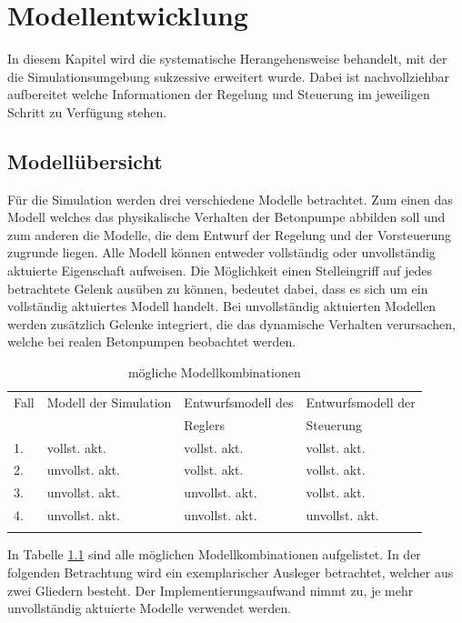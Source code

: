 \chapter{Modellentwicklung}\label{ch:modellentwicklung}

In diesem Kapitel wird die systematische Herangehensweise behandelt, mit der die Simulationsumgebung sukzessive erweitert wurde. Dabei ist nachvollziehbar aufbereitet welche Informationen der Regelung und Steuerung im jeweiligen Schritt zu Verfügung stehen.

\section{Modellübersicht}

Für die Simulation werden drei verschiedene Modelle betrachtet. Zum einen das Modell welches das physikalische Verhalten der Betonpumpe abbilden soll und zum anderen die Modelle, die dem Entwurf der Regelung und der Vorsteuerung zugrunde liegen. Alle Modell können entweder vollständig oder unvollständig aktuierte Eigenschaft aufweisen. Die Möglichkeit einen Stelleingriff auf jedes betrachtete Gelenk ausüben zu können, bedeutet dabei, dass es sich um ein vollständig aktuiertes Modell handelt. Bei unvollständig aktuierten Modellen werden zusätzlich Gelenke integriert, die das dynamische Verhalten verursachen, welche bei realen Betonpumpen beobachtet werden.\\

\begin{table}[htbp]
	\centering
	\caption{mögliche Modellkombinationen}
	\label{tab:Modellübersicht}
	\begin{tabular}{llll}
		Fall & Modell der Simulation & Entwurfsmodell des  & Entwurfsmodell der\\
		&						& Reglers			& Steuerung\\
		\toprule
		1.& vollst. akt. & vollst. akt. & vollst. akt.\\
		2.& unvollst. akt. & vollst. akt. & vollst. akt.\\
		3.& unvollst. akt. & unvollst. akt. & vollst. akt.\\
		4.& unvollst. akt. & unvollst. akt. & unvollst. akt.\\
		\bottomrule\\
	\end{tabular}
\end{table}

In Tabelle \ref{tab:Modellübersicht} sind alle möglichen Modellkombinationen aufgelistet. In der folgenden Betrachtung wird ein exemplarischer Ausleger betrachtet, welcher aus zwei Gliedern besteht. Der Implementierungsaufwand nimmt zu, je mehr unvollständig aktuierte Modelle verwendet werden.


